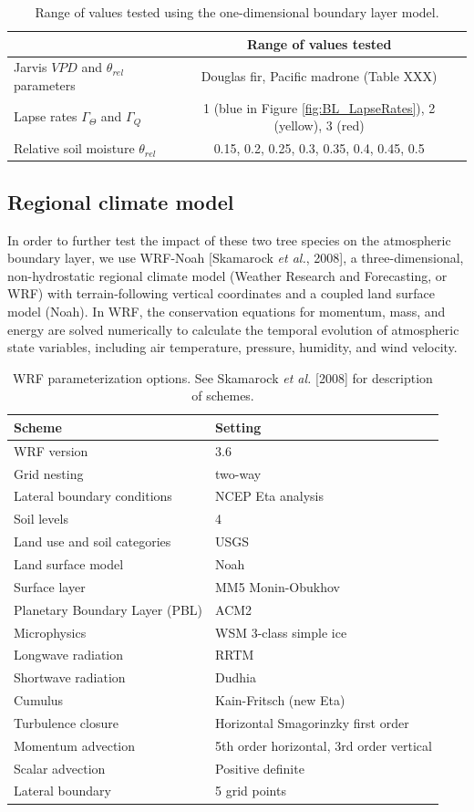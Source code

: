 \begin{table}
\begin{tabular}{ l c }
\hline
 & Range of values tested \\ \hline
Jarvis $VPD$ and $\theta_{rel}$ parameters & Douglas fir, Pacific madrone (Table XXX)\\
Lapse rates $\Gamma_{\Theta}$ and $\Gamma_Q$ & 1 (blue in Figure \ref{fig:BL_LapseRates}), 2 (yellow), 3 (red)\\
Relative soil moisture $\theta_{rel}$ & 0.15, 0.2, 0.25, 0.3, 0.35, 0.4, 0.45, 0.5\\
\hline
\end{tabular}
\caption{Range of values tested using the one-dimensional boundary layer model.}
\label{table:BL_1Druns}
\end{table}

\subsection{Regional climate model}
In order to further test the impact of these two tree species on the atmospheric boundary layer, we use WRF-Noah [Skamarock \textit{et al.}, 2008], a three-dimensional, non-hydrostatic regional climate model (Weather Research and Forecasting, or WRF) with terrain-following vertical coordinates and a coupled land surface model (Noah).  In WRF, the conservation equations for momentum, mass, and energy are solved numerically to calculate the temporal evolution of atmospheric state variables, including air temperature, pressure, humidity, and wind velocity.  

\begin{table}
\begin{tabular}{l l}
\hline
Scheme & Setting \\ \hline
WRF version & 3.6 \\
Grid nesting & two-way \\
Lateral boundary conditions & NCEP Eta analysis \\
Soil levels & 4 \\
Land use and soil categories & USGS \\
Land surface model & Noah \\
Surface layer & MM5 Monin-Obukhov \\
Planetary Boundary Layer (PBL) & ACM2 \\
Microphysics & WSM 3-class simple ice \\
Longwave radiation & RRTM \\
Shortwave radiation & Dudhia \\
Cumulus & Kain-Fritsch (new Eta) \\
Turbulence closure & Horizontal Smagorinzky first order \\
Momentum advection & 5th order horizontal, 3rd order vertical \\
Scalar advection & Positive definite \\
Lateral boundary & 5 grid points \\
\hline
\end{tabular}
\caption{WRF parameterization options.  See Skamarock \textit{et al.} [2008] for description of schemes.}
\label{table:BL_paramschemes}
\end{table}

